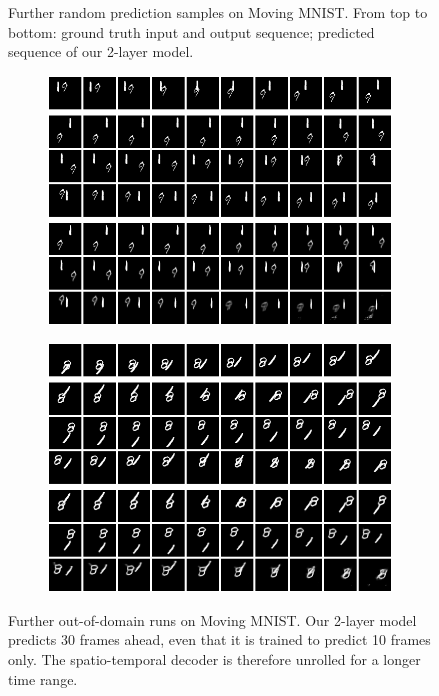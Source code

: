 \begin{figure}[htpb]
\begin{subfigure}{0.49\textwidth}
  \caption{}
  \label{fig:mm-pred-random4}
\end{subfigure}
\caption[Random Prediction Samples on Moving MNIST]{Further random prediction samples on Moving MNIST. From top to bottom: ground truth input and output sequence; predicted sequence of our 2-layer model.} \label{fig:mm-pred-random}
\end{figure}

\begin{figure}[htpb]
\centering
\begin{subfigure}{0.5\textwidth}
  \centering
  \includegraphics[width=0.9\linewidth]{figures/pred/mm/long/prediction-00.png}
  \caption{}
  \label{fig:mm-pred-long1}
\end{subfigure}%
\begin{subfigure}{0.5\textwidth}
  \centering
  \includegraphics[width=0.9\linewidth]{figures/pred/mm/long/prediction-07.png}
  \caption{}
  \label{fig:mm-pred-long2}
\end{subfigure}
\caption[Long-Term Prediction Samples on Moving MNIST]{Further out-of-domain runs on Moving MNIST. Our 2-layer model predicts 30 frames ahead, even that it is trained to predict 10 frames only. The spatio-temporal decoder is therefore unrolled for a longer time range.} \label{fig:mm-pred-long}
\end{figure}

